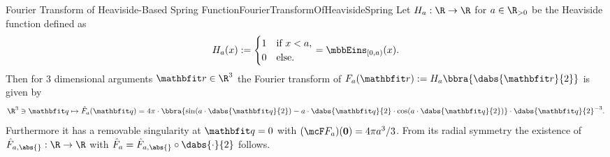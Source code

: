 \begin{mlem}{Fourier Transform of Heaviside-Based Spring Function}{FourierTransformOfHeavisideSpring}
    Let $H_a:\R\to\R$ for $a\in\R_{>0}$ be the Heaviside function defined as
    \[
        H_a(x) := \begin{cases}
            1 & \text{if } x<a, \\
            0 & \text{else}.
        \end{cases} = \mbbEins_{[0,a)}(x).
    \]
    Then for $3$ dimensional arguments $\vr\in\R^3$ the Fourier transform of $F_a(\vr):=H_a\bbra{\dabs{\vr}{2}}$ is given by 
    \[
        \R^3\ni\vq\mapsto \hat F_a(\vq) = 4\pi\cdot\bbra{\sin(a\cdot\dabs{\vq}{2}) - a\cdot\dabs{\vq}{2}\cdot\cos(a\cdot\dabs{\vq}{2})}\cdot\dabs{\vq}{2}^{-3}.
    \]
    Furthermore it has a removable singularity at $\vq = 0$ with $(\mcF F_a)(\mathbf{0}) = 4\pi a^3/3$. From its radial symmetry the existence of $\hat F_{a,\abs{}}:\R\to\R$ with $\hat F_a = \hat F_{a,\abs{}}\circ\dabs{\cdot}{2}$ follows. 
\end{mlem}